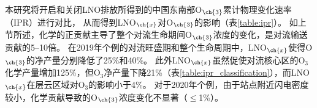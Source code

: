 本研究将开启和关闭LNO排放所得到的中国东南部O$_{\ch{3}}$累计物理变化速率（IPR）进行对比，
从而得到LNO$_{\ch{x}}$对O$_{\ch{3}}$的影响（表\ref{table:ipr}）。
如上节所述，化学的正贡献主导了整个对流生命期间O$_{\ch{3}}$浓度的变化，是对流输送贡献的5--10倍。
在2019年个例的对流旺盛期和整个生命周期中，LNO$_{\ch{x}}$使得O$_{\ch{3}}$的净产量分别降低了25\%和40\%。
此外LNO$_{\ch{x}}$虽然促使对流核心区的O$_3$化学产量增加125\%，但O$_3$净产量下降21\%（表\ref{table:ipr_classification}），而LNO$_{\ch{x}}$在层云区域对O$_3$的影响小于4\%。
对于2020年个例，由于站点附近闪电密度较小，化学贡献导致的O$_{\ch{3}}$浓度变化不显著（$\leq$1\%）。



